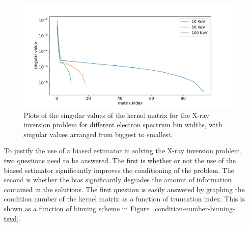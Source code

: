 \begin{figure}[p]
    \centering
    \includegraphics[width=1.0\textwidth]{figures/fig_5.pdf}
    \caption{Plots of the singular values of the kernel matrix for the X-ray inversion problem for different electron spectrum bin widths, with singular values arranged from biggest to smallest.}
    \label{singular-value-plots}
\end{figure}

To justify the use of a biased estimator in solving the X-ray inversion problem, two questions need to be answered. The first is whether or not the use of the biased estimator significantly improves the conditioning of the problem. The second is whether the bias significantly degrades the amount of information contained in the solutions. The first question is easily answered by graphing the condition number of the kernel matrix as a function of truncation index. This is shown as a function of binning scheme in Figure~\ref{condition-number-binning-tsvd}.  

